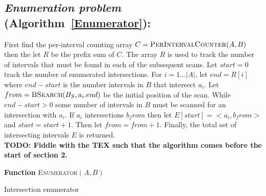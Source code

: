 \subsection{{\em Enumeration problem} (Algorithm~\ref{Enumerator}):} First find
the per-interval counting array
	 $C=\textsc{PerIntervalCounter}(A,B)$ then the let $R$ be the prefix sum
	 of $C$. The array $R$ is used to track the number of intervals that must be
	found in each of the subsequent scans.  Let $start = 0$ track the number of
	enumerated intersections.  For $i=1\dots|A|$, let $end = R[i]$ where $end -
	start$ is the number intervals in $B$ that intersect $a_i$.  Let
	$from=\textsc{BSearch}(B_S, a_i.end)$ be the initial position of the scan.
	While $end - start > 0$ some number of intervals in $B$ must be scanned for
	an intersection with $a_i$.  If $a_i$ intersections $b_from$ then let
	$E[start] = <a_i, b_from>$ and $start=start+1$.  Then let $from = from +1$.
	Finally, the total set of intersecting intervals $E$ is returned.\\
    \textbf{TODO: Fiddle with the TEX such that the algorithm comes before
    the start of section 2.}
    \\
    
	 \begin{algorithm}[h!]
		   \DontPrintSemicolon
		   \footnotesize
		    
		   \BlankLine
		   \textbf{Function} \textsc{Enumerator}$(A,B)$
		   \caption{Intersection enumerator}
			\label{Enumerator}
	 \end{algorithm}
